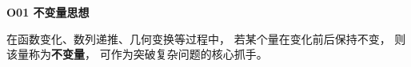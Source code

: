 \begin{ideaBox}
\textbf{O01 不变量思想}

在函数变化、数列递推、几何变换等过程中，
若某个量在变化前后保持不变，
则该量称为\textbf{不变量}，
可作为突破复杂问题的核心抓手。
\end{ideaBox}
